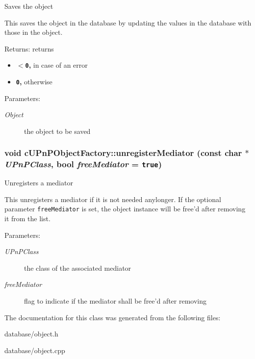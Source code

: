 Saves the object

This saves the object in the database by updating the values in the database with those in the object.

\begin{Desc}
\item[Returns:]returns\begin{itemize}
\item {\bf {\tt $<$0},} in case of an error\item {\bf {\tt 0},} otherwise \end{itemize}
\end{Desc}
\begin{Desc}
\item[Parameters:]
\begin{description}
\item[{\em Object}]the object to be saved \end{description}
\end{Desc}
 \hypertarget{classcUPnPObjectFactory_ae48ef32453881a77857bf9772d79d22}{
\subsubsection[{unregisterMediator}]{\setlength{\rightskip}{0pt plus 5cm}void cUPnPObjectFactory::unregisterMediator (const char $\ast$ {\em UPnPClass}, \/  bool {\em freeMediator} = {\tt true})}}
\label{classcUPnPObjectFactory_ae48ef32453881a77857bf9772d79d22}


Unregisters a mediator

This unregisters a mediator if it is not needed anylonger. If the optional parameter {\tt freeMediator} is set, the object instance will be free'd after removing it from the list.

\begin{Desc}
\item[Parameters:]
\begin{description}
\item[{\em UPnPClass}]the class of the associated mediator \item[{\em freeMediator}]flag to indicate if the mediator shall be free'd after removing \end{description}
\end{Desc}


The documentation for this class was generated from the following files:\begin{CompactItemize}
\item 
database/object.h\item 
database/object.cpp\end{CompactItemize}
